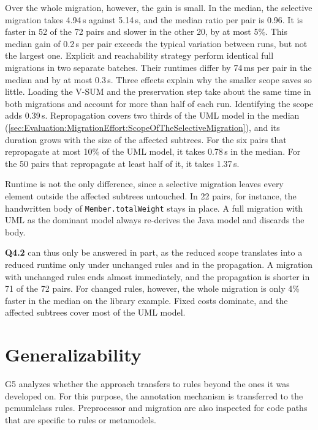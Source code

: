Over the whole migration, however, the gain is small.
In the median, the selective migration takes 4.94\,s against 5.14\,s, and the median ratio per pair is 0.96.
It is faster in 52 of the 72 pairs and slower in the other 20, by at most 5\%.
This median gain of 0.2\,s per pair exceeds the typical variation between runs, but not the largest one.
Explicit and reachability strategy perform identical full migrations in two separate batches.
Their runtimes differ by 74\,ms per pair in the median and by at most 0.3\,s.
Three effects explain why the smaller scope saves so little.
Loading the V-SUM and the preservation step take about the same time in both migrations and account for more than half of each run.
Identifying the scope adds 0.39\,s.
Repropagation covers two thirds of the UML model in the median (\autoref{sec:Evaluation:MigrationEffort:ScopeOfTheSelectiveMigration}), and its duration grows with the size of the affected subtrees.
For the six pairs that repropagate at most 10\% of the UML model, it takes 0.78\,s in the median.
For the 50 pairs that repropagate at least half of it, it takes 1.37\,s.

Runtime is not the only difference, since a selective migration leaves every element outside the affected subtrees untouched.
In 22 pairs, for instance, the handwritten body of \texttt{Member.totalWeight} stays in place.
A full migration with UML as the dominant model always re-derives the Java model and discards the body.

\textbf{Q4.2} can thus only be answered in part, as the reduced scope translates into a reduced runtime only under unchanged rules and in the propagation.
A migration with unchanged rules ends almost immediately, and the propagation is shorter in 71 of the 72 pairs.
For changed rules, however, the whole migration is only 4\% faster in the median on the library example.
Fixed costs dominate, and the affected subtrees cover most of the UML model.

\section{Generalizability}
\label{sec:Evaluation:Generalizability}

G5 analyzes whether the approach transfers to rules beyond the ones it was developed on.
For this purpose, the annotation mechanism is transferred to the pcmumlclass rules.
Preprocessor and migration are also inspected for code paths that are specific to rules or metamodels.

